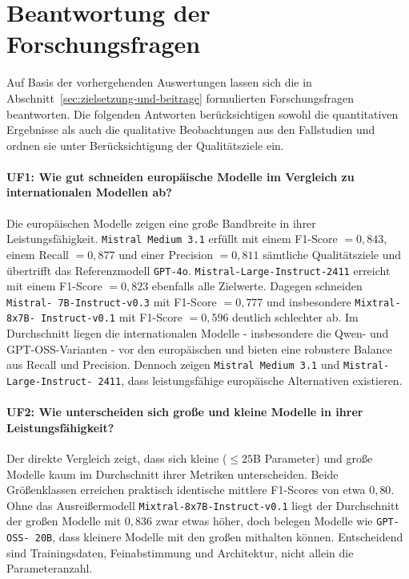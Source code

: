 \section{Beantwortung der Forschungsfragen}\label{sec:antworten-auf-forschungsfragen}

Auf Basis der vorhergehenden Auswertungen lassen sich die in Abschnitt~\ref{sec:zielsetzung-und-beitrage} formulierten Forschungsfragen beantworten. Die folgenden Antworten berücksichtigen sowohl die quantitativen Ergebnisse als auch die qualitative Beobachtungen aus den Fallstudien und ordnen sie unter Berücksichtigung der Qualitätsziele ein.

\paragraph{UF1: Wie gut schneiden europäische Modelle im Vergleich zu internationalen Modellen ab?}

Die europäischen Modelle zeigen eine große Bandbreite in ihrer Leistungsfähigkeit. \texttt{Mistral Medium 3.1} erfüllt mit einem F1-Score $= 0{,}843$, einem Recall $= 0{,}877$ und einer Precision $= 0{,}811$ sämtliche Qualitätsziele und übertrifft das Referenzmodell \texttt{GPT-4o}. \texttt{Mistral-Large-Instruct-2411} erreicht mit einem F1-Score $= 0{,}823$ ebenfalls alle Zielwerte. Dagegen schneiden \texttt{Mistral-\linebreak~7B-Instruct-v0.3} mit F1-Score $= 0{,}777$ und insbesondere \texttt{Mixtral-8x7B-\linebreak~Instruct-v0.1} mit F1-Score $= 0{,}596$ deutlich schlechter ab. Im Durchschnitt liegen die internationalen Modelle - insbesondere die Qwen- und GPT-OSS-Varianten - vor den europäischen und bieten eine robustere Balance aus Recall und Precision. Dennoch zeigen \texttt{Mistral Medium 3.1} und \texttt{Mistral-Large-Instruct-\linebreak~2411}, dass leistungsfähige europäische Alternativen existieren.

\paragraph{UF2: Wie unterscheiden sich große und kleine Modelle in ihrer Leistungsfähigkeit?}

Der direkte Vergleich zeigt, dass sich kleine ($\leq 25$B Parameter) und große Modelle kaum im Durchschnitt ihrer Metriken unterscheiden. Beide Größenklassen erreichen praktisch identische mittlere F1-Scores von etwa $0{,}80$. Ohne das Ausreißermodell \texttt{Mixtral-8x7B-Instruct-v0.1} liegt der Durchschnitt der großen Modelle mit $0{,}836$ zwar etwas höher, doch belegen Modelle wie \texttt{GPT-OSS-\linebreak~20B}, dass kleinere Modelle mit den großen mithalten können. Entscheidend sind Trainingsdaten, Feinabstimmung und Architektur, nicht allein die Parameteranzahl.

